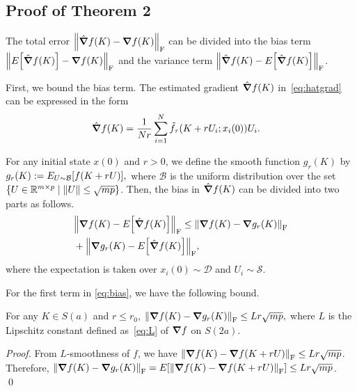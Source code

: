 \subsection{Proof of Theorem 2}\label{sec:proof-theorem2}
The total error $\norm{\hat \grad f(K) - \grad f(K)}_\mathrm{F}$ can be divided into the bias term $\norm{E\qty[\hat \grad f(K)] - \grad f(K)}_\mathrm{F}$ and the variance term $\norm{\hat \grad f(K) - E\qty[\hat \grad f(K)]}_\mathrm{F}$.

First, we bound the bias term.
The estimated gradient $\hat \grad f(K)$ in~\eqref{eq:hatgrad} can be expressed in the form
\begin{align}
  \hat \grad f(K) & = \frac{1}{Nr}\sum_{i=1}^N \tilde f_\tau(K+rU_i;x_i(0))U_i.\label{eq:hatgrad-ftau}
\end{align}

For any initial state $x(0)$ and $r > 0$, we define 
the smooth function $g_r(K)$ by
$
  g_r(K) := E_{U\sim \mathcal{B}}\qty[f(K+rU)],
$
where $\mathcal{B}$ is the uniform distribution over the set $\{U\in \mathbb{R}^{m\times p}\mid \norm{U}\leq \sqrt{mp}\}$.
Then, the bias in $\hat \grad f(K)$ can be divided into two parts as follows.
\begin{align}
  &\norm{\grad f(K)-E\qty[\hat\grad f(K)]}_\mathrm{F}\leq \norm{\grad f(K)-\grad g_r(K)}_\mathrm{F} \\
  &+ \norm{\grad g_r(K)-E\qty[\hat\grad f(K)]}_\mathrm{F}, \label{eq:bias}
\end{align}
where the expectation is taken over $x_i(0)\sim \mathcal D$ and $U_i \sim \mathcal S$.

For the first term in \eqref{eq:bias}, we have the following bound.
\begin{lemma}\label{lem:biasr}
  For any $K\in S(a)$ and $r \leq r_0$,
  $
    \norm{\grad f(K)-\grad g_r(K)}_\mathrm{F} \leq Lr\sqrt{mp},
  $
  where $L$ is the Lipschitz constant defined as~\eqref{eq:L} of $\grad f$ on $S(2a)$.
\end{lemma}
\begin{proof}
  From $L$-smoothness of $f$, we have $\norm{\grad f(K) - \grad f(K+rU)}_\mathrm{F}\leq Lr\sqrt{mp}$. Therefore, $\norm{\grad f(K)-\grad g_r(K)}_\mathrm{F} = E\qty[\norm{\grad f(K)-\grad f(K+rU)}_\mathrm{F}]\leq Lr\sqrt{mp}$. \qed
\end{proof}

